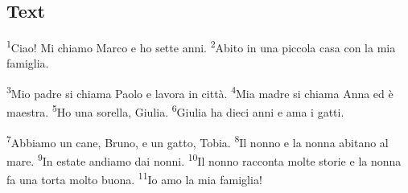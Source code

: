 \documentclass[11pt,a4paper,twoside,openright]{book}
\newenvironment{storytext}{\par\begingroup\large\setlength{\parskip}{8pt}\linespread{1.15}\selectfont}{\par\endgroup}
\newcommand{\sentnum}[1]{\textsuperscript{\color{muted}\tiny #1}}
\begin{document}
\subsection*{Text}
\begin{storytext}
\sentnum{1}Ciao! Mi chiamo Marco e ho sette anni. \sentnum{2}Abito in una piccola casa con la mia famiglia.\par
\sentnum{3}Mio padre si chiama Paolo e lavora in città. \sentnum{4}Mia madre si chiama Anna ed è maestra. \sentnum{5}Ho una sorella, Giulia. \sentnum{6}Giulia ha dieci anni e ama i gatti.\par
\sentnum{7}Abbiamo un cane, Bruno, e un gatto, Tobia. \sentnum{8}Il nonno e la nonna abitano al mare. \sentnum{9}In estate andiamo dai nonni. \sentnum{10}Il nonno racconta molte storie e la nonna fa una torta molto buona. \sentnum{11}Io amo la mia famiglia!\par
\end{storytext}
\end{document}
